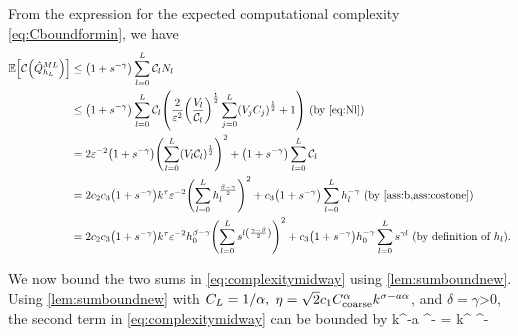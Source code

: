 From the expression for the expected computational complexity \cref{eq:Cboundformin}, we have
\begin{align}
\EXP{\Cost{\QhatMLhL}} &\leq \mleft(1+s^{-\gamma}\mright)\sum_{l=0}^{L} \Cl \Nl\nonumber\\
&\leq \mleft(1+s^{-\gamma}\mright)\sum_{l=0}^L \Cl \mleft(\frac2{\eps^{2}} \mleft(\frac{\Vl}{\Cl}\mright)^{\half}\sum_{j=0}^L \mleft(\Vj\Cj\mright)^{\half} + 1\mright) \text{ (by \eqref{eq:Nl})}\nonumber\\
&= 2\eps^{-2}\mleft(1+s^{-\gamma}\mright)\mleft(\sum_{l=0}^L\mleft(\Vl\Cl\mright)^{\half}\mright)^2 + \mleft(1+s^{-\gamma}\mright)\sum_{l=0}^L \Cl\nonumber\\
&= 2 \ct \cth \mleft(1+s^{-\gamma}\mright)k^{\tau}\eps^{-2} \mleft(\sum_{l=0}^L \hl^{\frac{\beta-\gamma}2}\mright)^2 + \cth \mleft(1+s^{-\gamma}\mright) \sum_{l=0}^L \hl^{-\gamma} \text{ (by \cref{ass:b,ass:costone})}\nonumber\\
&= 2 \ct\cth \mleft(1+s^{-\gamma}\mright)k^{\tau}\eps^{-2}\hz^{\beta-\gamma}\mleft(\sum_{l=0}^L s^{l\mleft(\frac{\gamma-\beta}2\mright)}\mright)^2 + \cth\mleft(1+s^{-\gamma}\mright) \hz^{-\gamma} \sum_{l=0}^L s^{\gamma l} \text{ (by definition of } \hl\text{).}\label{eq:complexitymidway}
\end{align}

We now bound the two sums in \cref{eq:complexitymidway} using \cref{lem:sumboundnew}. Using \cref{lem:sumboundnew} with $C_{L} = 1/\alpha,$ $\eta = \sqrt{2}c_{1}C_{\mathrm{coarse}}^\alpha k^{\sigma - a\alpha}$, and $\delta = \gamma$>0, the second term in \eqref{eq:complexitymidway} can be bounded by %
\beq\label{eq:firstterm}
\cth{} k^{\frac{\gamma\sigma}\alpha-a\gamma} \eps^{-\frac\gamma\alpha}
=  k^{\frac{\gamma\sigma}\alpha} \eps^{-\frac\gamma\alpha}
\eeq

